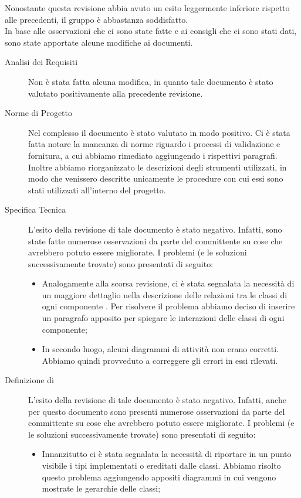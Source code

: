     Nonostante questa revisione abbia avuto un esito leggermente inferiore rispetto alle precedenti, il gruppo è abbastanza soddisfatto.\\
    In base alle osservazioni che ci sono state fatte e ai consigli che ci sono stati dati, sono state apportate alcune modifiche ai documenti.
    \begin{description}
        \item[Analisi dei Requisiti] Non è stata fatta alcuna modifica, in quanto tale documento è stato valutato positivamente alla precedente revisione.
        \item[Norme di Progetto] Nel complesso il documento è stato valutato in modo positivo. Ci è stata fatta notare la mancanza di norme riguardo i processi di validazione e fornitura, a cui abbiamo rimediato aggiungendo i rispettivi paragrafi. Inoltre abbiamo riorganizzato le descrizioni degli strumenti utilizzati, in modo che venissero descritte unicamente le procedure con cui essi sono stati utilizzati all'interno del progetto.   
        \item[Specifica Tecnica] L’esito della revisione di tale documento è stato negativo. Infatti, sono state fatte numerose osservazioni da parte del committente su cose che avrebbero potuto essere migliorate. I problemi (e le soluzioni successivamente trovate) sono presentati di seguito:
            \begin{itemize}
                \item Analogamente alla scorsa revisione, ci è stata segnalata la necessità di un maggiore dettaglio nella descrizione delle relazioni tra le classi di ogni componente . Per risolvere il problema abbiamo deciso di inserire un paragrafo apposito per spiegare le interazioni delle classi di ogni componente;
                \item In secondo luogo, alcuni diagrammi di attività non erano corretti. Abbiamo quindi provveduto a correggere gli errori in essi rilevati.
            \end{itemize}
    \item[Definizione di ] L’esito della revisione di tale documento è stato negativo. Infatti, anche per questo documento sono presenti numerose osservazioni da parte del committente su cose che avrebbero potuto essere migliorate. I problemi (e le soluzioni successivamente trovate) sono presentati di seguito:
            \begin{itemize}
                \item Innanzitutto ci è stata segnalata la necessità di riportare in un punto visibile i tipi implementati o ereditati dalle classi. Abbiamo risolto questo problema aggiungendo appositi diagrammi in cui vengono mostrate le gerarchie delle classi;

\end{itemize}
\end{description}
